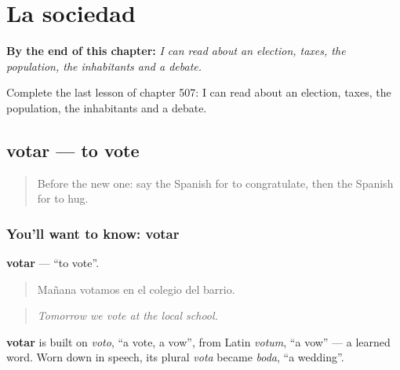 
\chapter{La sociedad}
\label{ch:es-la-sociedad}

\begin{chapteropening}
\textbf{By the end of this chapter:} \emph{I can read about an election, taxes, the population, the inhabitants and a debate.}

Complete the last lesson of chapter 507: I can read about an election, taxes, the population, the inhabitants and a debate.
\end{chapteropening}

\section[votar]{votar — to vote}

\label{lesson:ES-C507-votar}



\begin{quote}
Before the new one: say the Spanish for to congratulate, then the Spanish for to hug.
\end{quote}

\subsection*{You'll want to know: votar}
\textbf{votar} — \textquotedblleft{}to vote\textquotedblright{}.

\begin{quote}
Mañana votamos en el colegio del barrio.
\end{quote}

\begin{quote}
\emph{Tomorrow we vote at the local school.}
\end{quote}

\begin{cousinweb}
\textbf{votar} is built on \emph{voto}, \textquotedblleft{}a vote, a vow\textquotedblright{}, from Latin \emph{votum}, \textquotedblleft{}a vow\textquotedblright{} — a learned word. Worn down in speech, its plural \emph{vota} became \emph{boda}, \textquotedblleft{}a wedding\textquotedblright{}.
\end{cousinweb}

